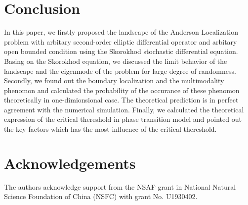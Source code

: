 \documentclass[a4paper,11pt]{article}
\begin{document}
\section{Conclusion}

In this paper, we firstly proposed the landscape of the Anderson Localization problem with arbitary second-order elliptic differential operator and arbitary open bounded condition using the Skorokhod stochastic differential equation. Basing on the Skorokhod equation, we discussed the limit behavior of the landscape and the eigenmode of the problem for large degree of randomness. Secondly, we found out the boundary localization and the multimodality phenomon and calculated the probability of the occurance of these phenomon theoretically in one-dimionsional case. The theoretical prediction is in perfect agreement with the numerical simulation. Finally, we calculated the theoretical expression of the critical thereshold in phase transition model and pointed out the key factors which has the most influence of the critical thereshold.

\section*{Acknowledgements}
The authors acknowledge support from the NSAF grant in National Natural Science Foundation of China (NSFC) with grant No. U1930402.

\setlength{\bibsep}{5pt}
\small

\end{document}
